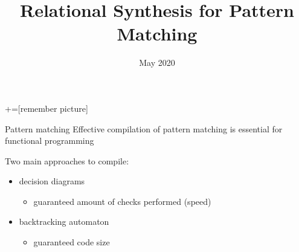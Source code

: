 \documentclass[aspectratio=169
  , xcolor={svgnames}
  , hyperref={ colorlinks,citecolor=Blue
             , linkcolor=DarkRed,urlcolor=DarkBlue}
  , russian
  ]{beamer}
\title{Relational Synthesis for Pattern Matching}
\date{May 2020}
\begin{document}
\maketitle

+=[remember picture] 

\everymath{\displaystyle}

\begin{frame}{Pattern matching}
Effective compilation of pattern matching is essential for functional programming
\vspace{1cm}

Two main approaches to compile:
\begin{itemize}
\item decision diagrams
\begin{itemize}
\item guaranteed amount of checks performed (speed)
\end{itemize}
\item backtracking automaton
\begin{itemize}
\item guaranteed code size
\end{itemize}
\end{itemize}
  \note{}
  
\end{frame}
\end{document}
